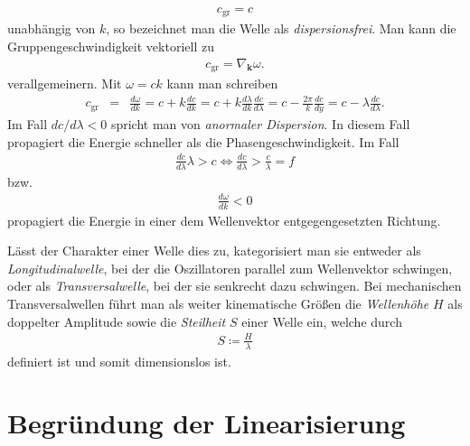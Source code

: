 \documentclass{book}
\begin{document}
%
\begin{eqnarray}
c_{\text{gr}} = c
\end{eqnarray}
%
unabhängig von $k$, so bezeichnet man die Welle als \textit{dispersionsfrei}. Man kann die Gruppengeschwindigkeit vektoriell zu
%
\begin{eqnarray}
c_{\text{gr}} = \nabla_{\mathbf{k}}\omega.
\end{eqnarray}
%
verallgemeinern. Mit $\omega = ck$ kann man schreiben
%
\begin{eqnarray}
c_{\text{gr}} & = & \frac{d\omega}{dk} = c + k\frac{dc}{dk} = c + k\frac{d\lambda}{dk}\frac{dc}{d\lambda} = c - \frac{2\pi}{k}\frac{dc}{dy} = c - \lambda\frac{dc}{d\lambda}.
\end{eqnarray}
%
Im Fall $dc/d\lambda < 0$ spricht man von \textit{anormaler Dispersion}. In diesem Fall propagiert die Energie schneller als die Phasengeschwindigkeit. Im Fall
%
\begin{eqnarray}
\frac{dc}{d\lambda}\lambda > c \Leftrightarrow \frac{dc}{d\lambda} > \frac{c}{\lambda} = f
\end{eqnarray}
%
bzw.
%
\begin{eqnarray}
\frac{d\omega}{dk} < 0
\end{eqnarray}
%
propagiert die Energie in einer dem Wellenvektor entgegengesetzten Richtung.

Lässt der Charakter einer Welle dies zu, kategorisiert man sie entweder als \textit{Longitudinalwelle}, bei der die Oszillatoren parallel zum Wellenvektor schwingen, oder als \textit{Transversalwelle}, bei der sie senkrecht dazu schwingen. Bei mechanischen Transversalwellen führt man als weiter kinematische Größen die \textit{Wellenhöhe} $H$ als doppelter Amplitude sowie die \textit{Steilheit} $S$ einer Welle ein, welche durch
%
\begin{eqnarray}
S \coloneqq \frac{H}{\lambda}
\end{eqnarray}
%
definiert ist und somit dimensionslos ist.

\section{Begründung der Linearisierung}
\label{sec:begruendung_der_linearisierung}
\end{document}
